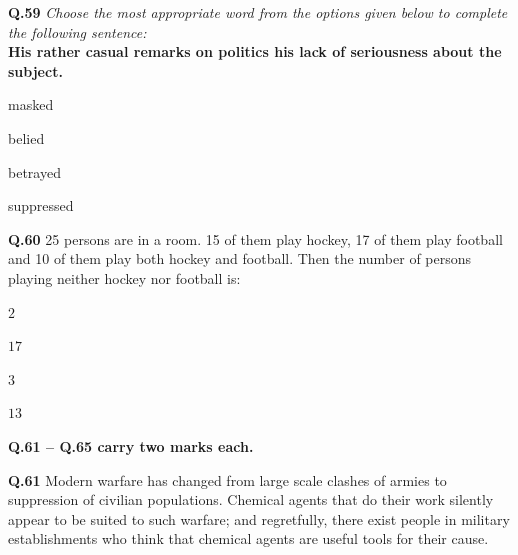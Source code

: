 \documentclass[journal,12pt,onecolumn]{IEEEtran}
\theoremstyle{remark}
\begin{document}
\begin{enumerate}
    \textbf{Q.59} \textit{Choose the most appropriate word from the options given below to complete the following sentence:}\\
    \textbf{His rather casual remarks on politics \underline{\hspace{2cm}} his lack of seriousness about the subject.}
    \hfill{}
    \begin{enumerate}[label=(\Alph*)]
    \begin{multicols}{4}
    \item masked
    \item belied
    \item betrayed
    \item suppressed
    \end{multicols}
    \end{enumerate}

    \textbf{Q.60} 25 persons are in a room. 15 of them play hockey, 17 of them play football and 10 of them play both hockey and football. Then the number of persons playing neither hockey nor football is:
    \hfill{}
    \begin{enumerate}[label=(\Alph*)]
    \begin{multicols}{4}
    \item $2$
    \item $17$
    \item $3$
    \item $13$
    \end{multicols}
    \end{enumerate}

    \medskip

    \noindent\textbf{Q.61 -- Q.65 carry two marks each.}

    \vspace{3mm}
   
    \textbf{Q.61} Modern warfare has changed from large scale clashes of armies to suppression of civilian populations. Chemical agents that do their work silently appear to be suited to such warfare; and regretfully, there exist people in military establishments who think that chemical agents are useful tools for their cause.


\end{enumerate}
\end{document}
